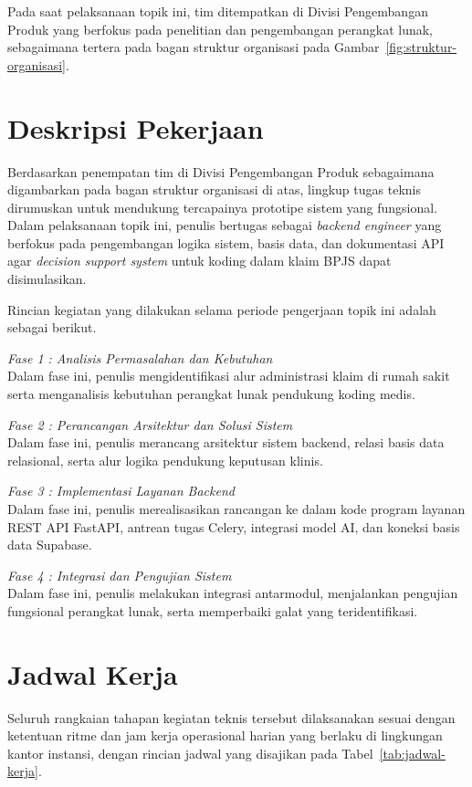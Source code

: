 Pada saat pelaksanaan topik ini, tim ditempatkan di Divisi Pengembangan Produk yang berfokus pada penelitian dan pengembangan perangkat lunak, sebagaimana tertera pada bagan struktur organisasi pada Gambar~\ref{fig:struktur-organisasi}.

\section{Deskripsi Pekerjaan}
Berdasarkan penempatan tim di Divisi Pengembangan Produk sebagaimana digambarkan pada bagan struktur organisasi di atas, lingkup tugas teknis dirumuskan untuk mendukung tercapainya prototipe sistem yang fungsional. Dalam pelaksanaan topik ini, penulis bertugas sebagai \textit{backend engineer} yang berfokus pada pengembangan logika sistem, basis data, dan dokumentasi API agar \textit{decision support system} untuk koding dalam klaim BPJS dapat disimulasikan.

Rincian kegiatan yang dilakukan selama periode pengerjaan topik ini adalah sebagai berikut.

\noindent\textit{Fase 1 : Analisis Permasalahan dan Kebutuhan}\\
Dalam fase ini, penulis mengidentifikasi alur administrasi klaim di rumah sakit serta menganalisis kebutuhan perangkat lunak pendukung koding medis.

\noindent\textit{Fase 2 : Perancangan Arsitektur dan Solusi Sistem}\\
Dalam fase ini, penulis merancang arsitektur sistem backend, relasi basis data relasional, serta alur logika pendukung keputusan klinis.

\noindent\textit{Fase 3 : Implementasi Layanan Backend}\\
Dalam fase ini, penulis merealisasikan rancangan ke dalam kode program layanan REST API FastAPI, antrean tugas Celery, integrasi model AI, dan koneksi basis data Supabase.

\noindent\textit{Fase 4 : Integrasi dan Pengujian Sistem}\\
Dalam fase ini, penulis melakukan integrasi antarmodul, menjalankan pengujian fungsional perangkat lunak, serta memperbaiki galat yang teridentifikasi.

\section{Jadwal Kerja}
Seluruh rangkaian tahapan kegiatan teknis tersebut dilaksanakan sesuai dengan ketentuan ritme dan jam kerja operasional harian yang berlaku di lingkungan kantor instansi, dengan rincian jadwal yang disajikan pada Tabel~\ref{tab:jadwal-kerja}.

